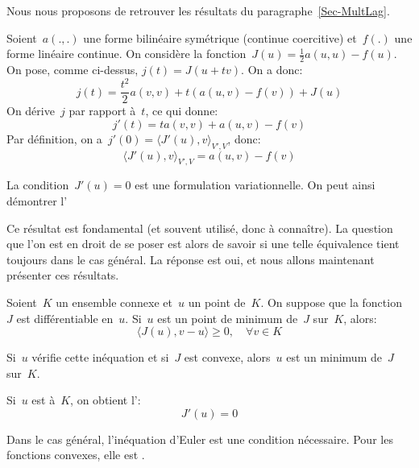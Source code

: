 \begin{remarque}
\normalsize Nous nous proposons de retrouver les résultats du paragraphe~\ref{Sec-MultLag}.

Soient~$a(.,.)$ une forme bilinéaire symétrique (continue coercitive) et~$f(.)$ une forme linéaire continue.
On considère la fonction~$J(u)=\frac12a(u,u)-f(u)$.
On pose, comme ci-dessus, $j(t)=J(u+tv)$. On a donc:
\[ j(t)=\frac{t^2}2a(v,v)+t\left(a(u,v)-f(v)\right)+J(u) \]
On dérive~$j$ par rapport à~$t$, ce qui donne:
\[ j'(t)=ta(v,v)+a(u,v)-f(v) \]
Par définition, on a~$j'(0)=\langle J'(u),v\rangle_{V',V}$, donc:
\[ \langle J'(u),v\rangle_{V',V} = a(u,v)-f(v) \]

La condition~$J'(u)=0$ est une formulation variationnelle.
On peut ainsi démontrer l'

Ce résultat est fondamental (et souvent utilisé, donc à connaître). La question que l'on est en droit de se poser est alors de savoir si une telle équivalence tient toujours dans le cas général. La réponse est oui, et nous allons maintenant présenter ces résultats.
\end{remarque}

\begin{theoreme}
Soient~$K$ un ensemble connexe et~$u$ un point de~$K$. On suppose que la fonction~$J$ est différentiable en~$u$. Si~$u$ est un point de minimum  de~$J$ sur~$K$, alors:
\begin{equation}
\langle J(u),v-u\rangle \ge 0, \quad \forall v\in K
\end{equation}

Si~$u$ vérifie cette inéquation et si~$J$ est convexe, alors~$u$ est un minimum  de~$J$ sur~$K$.
\end{theoreme}

Si~$u$ est  à~$K$, on obtient l':
\begin{equation}
J'(u)=0
\end{equation}

Dans le cas général, l'inéquation d'Euler est une condition nécessaire.
Pour les fonctions convexes, elle est .


